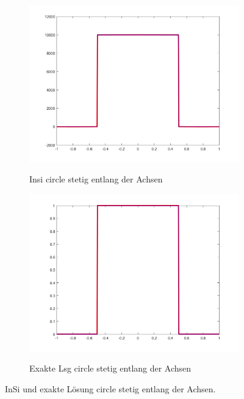 \begin{figure}[p]
  \centering
  \begin{subfigure}[b]{.48\linewidth}
    \centering
    \caption{Insi circle stetig entlang der Achsen}
    \includegraphics[trim = 40 30 50 20, clip, width=\linewidth]
      {pictures/chapExperiments/secGrayscale/circ/cont/inSiAxis.png}
    \label{fig:circContInSiAxis}
  \end{subfigure}
  \quad
  \begin{subfigure}[b]{.48\linewidth}
    \centering
    \caption{Exakte Lsg circle stetig entlang der Achsen}
    \includegraphics[trim = 40 30 50 20, clip, width=\linewidth]
      {pictures/chapExperiments/secGrayscale/circ/cont/exactSolutionAxis.png}
    \label{fig:circContExactSolAxis}
  \end{subfigure}
  \caption{InSi und exakte Lösung circle stetig entlang der Achsen.}
  \label{fig:circContPlotsAxis}
\end{figure}
